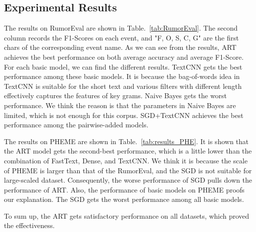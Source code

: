 \begin{table}[htbp]
	\caption{RumorEval}
	\centering
	\label{tab:RumorEval}
\end{table}


\subsection{Experimental Results}
The results on RumorEval are shown in Table.~{\ref{tab:RumorEval}}. The second column records the F1-Scores on each event, and "F, O, S, C, G" are the first chars of the corresponding event name. As we can see from the results, ART achieves the best performance on both average accuracy and average F1-Score. For each basic model, we can find the different results. TextCNN gets the best performance among these basic models. It is because the bag-of-words idea in TextCNN is suitable for the short text and various filters with different length effectively captures the features of key grams. Naive Bayes gets the worst performance. We think the reason is that the parameters in Naive Bayes are limited, which is not enough for this corpus. SGD+TextCNN achieves the best performance among the pairwise-added models. 

The results on PHEME are shown in Table.~\ref{tab:results_PHE}. It is shown that the ART model gets the second-best performance, which is a little lower than the combination of FastText, Dense, and TextCNN. We think it is because the scale of PHEME is larger than that of the RumorEval, and the SGD is not suitable for large-scaled dataset. Consequently, the worse performance of SGD pulls down the performance of ART. Also, the performance of basic models on PHEME proofs our explanation. The SGD gets the worst performance among all basic models. 

To sum up, the ART gets satisfactory performance on all datasets, which proved
the effectiveness.

